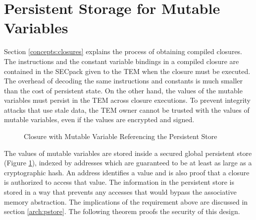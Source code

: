 \section{Persistent Storage for Mutable Variables}\label{concepts:pstore}

Section \ref{concepts:closures} explains the process of obtaining compiled
closures. The instructions and the constant variable bindings in a compiled
closure are contained in the SECpack given to the TEM when the closure must be
executed. The overhead of decoding the same instructions and constants is much
smaller than the cost of persistent state. On the other hand, the values of the
mutable variables must persist in the TEM across closure executions. To
prevent integrity attacks that use stale data, the TEM owner cannot be trusted
with the values of mutable variables, even if the values are encrypted and
signed.

\begin{figure}[hbtp]
	\caption{Closure with Mutable Variable Referencing the Persistent Store}
	\label{fig:persistent_store}
\end{figure}

The values of mutable variables are stored inside a secured global persistent
store (Figure \ref{fig:persistent_store}), indexed by addresses which are
guaranteed to be at least as large as a cryptographic hash. An address
identifies a value and is also proof that a closure is authorized to access
that value. The information in the persistent store is stored in a
way that prevents any accesses that would bypass the associative memory
abstraction. The implications of the requirement above are discussed in section
\ref{arch:pstore}. The following theorem proofs the security of this design.

